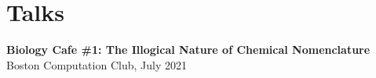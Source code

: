 \section{\mysidestyle Talks}
\filbreak

\textbf{Biology Cafe \#1: The Illogical Nature of Chemical Nomenclature}\\
Boston Computation Club, July 2021